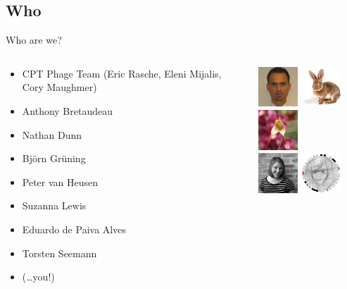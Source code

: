 \documentclass[12pt]{phage3slides} %
\begin{document}
\subsection{Who}
\begin{frame}{Who are we?}
    \begin{columns}
        \begin{column}{0.48\textwidth}
            \begin{itemize}
                \item CPT Phage Team (Eric Rasche, Eleni Mijalis, Cory Maughmer)
                \item Anthony Bretaudeau
                \item Nathan Dunn
                \item Bj\"orn Gr\"uning
                \item Peter van Heusen
                \item Suzanna Lewis
                \item Eduardo de Paiva Alves
                \item Torsten Seemann
                \item (\ldots you!)
            \end{itemize}
        \end{column}
        \begin{column}{0.48\textwidth}
            \includegraphics[width=1.5cm]{people/Eduardo-Alves}
            \includegraphics[width=1.5cm]{people/abretaud}
            \includegraphics[width=1.5cm]{people/bgruening} \\
            \includegraphics[width=1.5cm]{people/elenimijalis}
            \includegraphics[width=1.5cm]{people/erasche}

\end{column}
\end{columns}
\end{frame}
\end{document}
